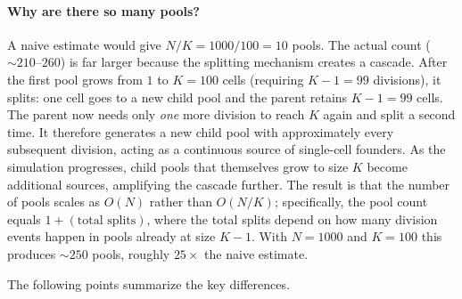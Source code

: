 \documentclass[12pt]{article}
\begin{document}
\paragraph{Why are there so many pools?}
A naive estimate would give $N/K = 1000/100 = 10$ pools.  The actual count
($\sim\!210$--$260$) is far larger because the splitting mechanism creates a
cascade.  After the first pool grows from $1$ to $K = 100$ cells (requiring
$K-1 = 99$ divisions), it splits: one cell goes to a new child pool and the
parent retains $K-1 = 99$ cells.  The parent now needs only \emph{one} more
division to reach $K$ again and split a second time.  It therefore generates
a new child pool with approximately every subsequent division, acting as a
continuous source of single-cell founders.  As the simulation progresses,
child pools that themselves grow to size $K$ become additional sources,
amplifying the cascade further.  The result is that the number of pools
scales as $O(N)$ rather than $O(N/K)$; specifically, the pool count equals
$1 + (\text{total splits})$, where the total splits depend on how many
division events happen in pools already at size $K-1$.  With $N = 1000$ and
$K = 100$ this produces $\sim\!250$ pools, roughly $25\times$ the naive
estimate.

The following points summarize the key differences.
\end{document}
